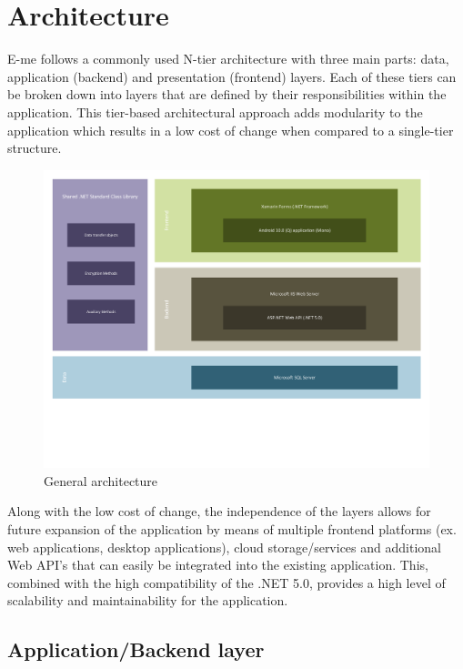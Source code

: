 \section{Architecture}

E-me follows a commonly used N-tier architecture with three main parts: data, application (backend) and presentation (frontend) layers.
Each of these tiers can be broken down into layers that are defined by their responsibilities within the application.
This tier-based architectural approach adds modularity to the application which results in a low cost of change when compared to a single-tier structure.


\begin{figure}[H]
	\centering
	\includegraphics[scale=0.57]{general-architecture}
	\caption{General architecture}
\end{figure}

Along with the low cost of change, the independence of the layers allows for future expansion of 
the application by means of multiple frontend platforms (ex. web applications, desktop applications), cloud storage/services and additional
Web API's that can easily be integrated into the existing application.
This, combined with the high compatibility of the .NET 5.0, provides a high level of scalability and maintainability for the application.

\subsection{Application/Backend layer}

